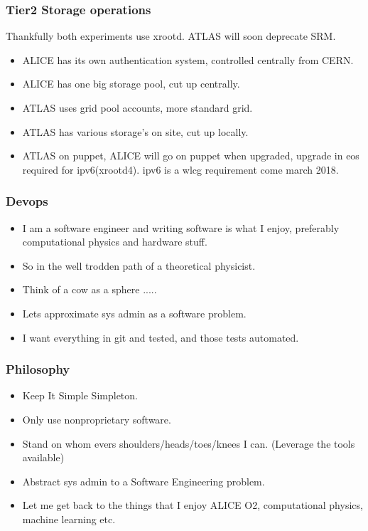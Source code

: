 \documentclass{beamer}
\begin{document}
\begin{frame}
  \frametitle{Tier2 Storage operations}
  Thankfully both experiments use xrootd. ATLAS will soon deprecate SRM.
  \begin{itemize}
    \item ALICE has its own authentication system, controlled centrally from CERN.
    \item ALICE has one big storage pool, cut up centrally.
    \item ATLAS uses grid pool accounts, more standard grid.
    \item ATLAS has various storage's on site, cut up locally.
    \item ATLAS on puppet, ALICE will go on puppet when upgraded, upgrade in eos required for ipv6(xrootd4). ipv6 is a wlcg requirement come march 2018.
  \end{itemize}
\end{frame}


\begin{frame}
  \frametitle{Devops}
    \begin{itemize}
            \item<1-> I am a software engineer and writing software is what I enjoy, preferably computational physics and hardware stuff.
            \item<2-> So in the well trodden path of a theoretical physicist.
            \item<3-> Think of a cow as a sphere .....
            \item<4-> Lets approximate sys admin as a software problem.
            \item<5-> I want everything in git and tested, and those tests automated.
    \end{itemize}

\end{frame}
\begin{frame}
  \frametitle{Philosophy}
  \begin{itemize}
    \item Keep It Simple Simpleton.
    \item Only use nonproprietary software.
    \item Stand on whom evers shoulders/heads/toes/knees I can. (Leverage the tools available)
    \item Abstract sys admin to a Software Engineering problem.
    \item Let me get back to the things that I enjoy ALICE O2, computational physics, machine learning etc.
  \end{itemize}
\end{frame}
\end{document}
